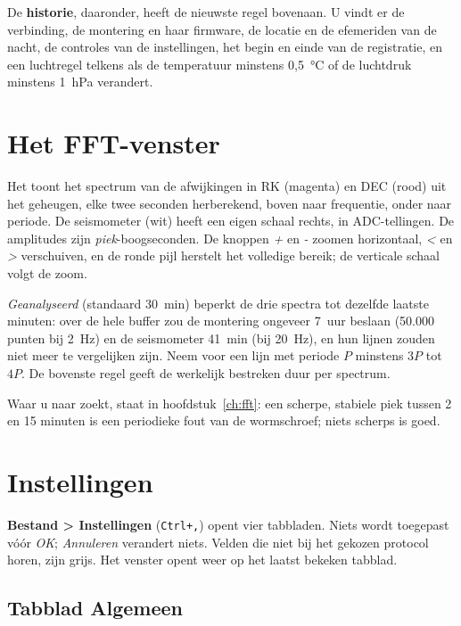 De \textbf{historie}, daaronder, heeft de nieuwste regel bovenaan. U vindt er
de verbinding, de montering en haar firmware, de locatie en de efemeriden van de
nacht, de controles van de instellingen, het begin en einde van de registratie,
en een luchtregel telkens als de temperatuur minstens 0,5~°C of de luchtdruk
minstens 1~hPa verandert.

\chapter{Het FFT-venster}
\label{ch:fftwin}


Het toont het spectrum van de afwijkingen in RK (magenta) en DEC (rood) uit het
geheugen, elke twee seconden herberekend, boven naar frequentie, onder naar
periode. De seismometer (wit) heeft een eigen schaal rechts, in ADC-tellingen.
De amplitudes zijn \emph{piek}-boogseconden. De knoppen \emph{+} en \emph{-}
zoomen horizontaal, \emph{<} en \emph{>} verschuiven, en de ronde pijl herstelt
het volledige bereik; de verticale schaal volgt de zoom.

\emph{Geanalyseerd} (standaard 30~min) beperkt de drie spectra tot dezelfde
laatste minuten: over de hele buffer zou de montering ongeveer 7~uur beslaan
(50.000 punten bij 2~Hz) en de seismometer 41~min (bij 20~Hz), en hun lijnen
zouden niet meer te vergelijken zijn. Neem voor een lijn met periode $P$ minstens
$3P$ tot $4P$. De bovenste regel geeft de werkelijk bestreken duur per spectrum.

Waar u naar zoekt, staat in hoofdstuk~\ref{ch:fft}: een scherpe, stabiele piek
tussen 2 en 15 minuten is een periodieke fout van de wormschroef; niets scherps
is goed.

\chapter{Instellingen}
\label{ch:config}

\textbf{Bestand > Instellingen} (\texttt{Ctrl+,}) opent vier tabbladen. Niets
wordt toegepast vóór \emph{OK}; \emph{Annuleren} verandert niets. Velden die
niet bij het gekozen protocol horen, zijn grijs. Het venster opent weer op
het laatst bekeken tabblad.

\needspace{0.6\textheight}
\section{Tabblad Algemeen}
\label{sec:conn}

